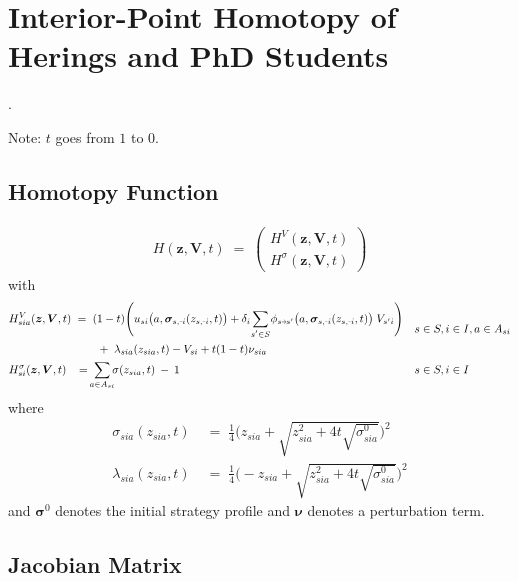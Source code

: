 \documentclass[11pt,fleqn]{article}
\newcommand{\bsigma}{\bm{\sigma}}
\newcommand{\bV}{\bm{V}}
\newcommand{\bnu}{\bm{\nu}}
\newcommand{\bz}{\bm{z}}
\newcommand{\shortminus}{{\text{\scalebox{0.4}[1.0]{\(-\)}}}}
\newcommand{\minusi}{\shortminus i}
\newcommand{\shortrightarrow}{\parbox{4pt}{\tikz{\draw[->](0,0)--(4pt,0);}}}
\newcommand{\phiss}{\phi_{s\shortrightarrow s'}}
\begin{document}
\newpage
\section{Interior-Point Homotopy of Herings and PhD Students}

\citep*{Heringsetal2021}.

Note: $t$ goes from $1$ to $0$.

\subsection*{Homotopy Function}

\begin{align*}
	H(\bz,\bV,t) \;=\;
	\begin{pmatrix} 
		H^{V}(\bz,\bV,t) \\ 
		H^{\sigma}(\bz,\bV,t) 
	\end{pmatrix}
\end{align*}
with
\begin{align*}
	& \begin{aligned}
		H^V_{sia}(\bz,\bV,t) & \;=\; (1-t) \Biggl( u_{si}\bigl(a,\bsigma_{s,\minusi}(z_{s,\minusi},t)\bigr) + \delta_i \sum\limits_{\mathclap{s'\in S}} \phiss\bigl(a,\bsigma_{s,\minusi}(z_{s,\minusi},t)\bigr) \; V_{s'i} \Biggr) \\
		& \qquad \;+\; \lambda_{sia}(z_{sia}, t) - V_{si} + t(1-t) \nu_{sia}
	\end{aligned} && s\in S, i\in I, a\in A_{si} \\
	& H^\sigma_{si}(\bz,\bV,t) \;\; \;=\; \sum\limits_{\mathclap{a\in A_{si}}} \sigma(z_{sia},t) \:-\: 1 && s\in S, i\in I
\end{align*}
where
\begin{align*}
	\sigma_{sia}(z_{sia}, t) & \;=\; \frac{1}{4} \Biggl( z_{sia} + \sqrt{z_{sia}^2+4t\sqrt{\sigma^0_{sia}}} \Biggr)^2 \\
	\lambda_{sia}(z_{sia}, t) & \;=\; \frac{1}{4} \Biggl( - z_{sia} + \sqrt{z_{sia}^2+4t\sqrt{\sigma^0_{sia}}} \Biggr)^2
\end{align*}
and $\bsigma^0$ denotes the initial strategy profile and $\bnu$ denotes a perturbation term.


\subsection*{Jacobian Matrix}
\end{document}
